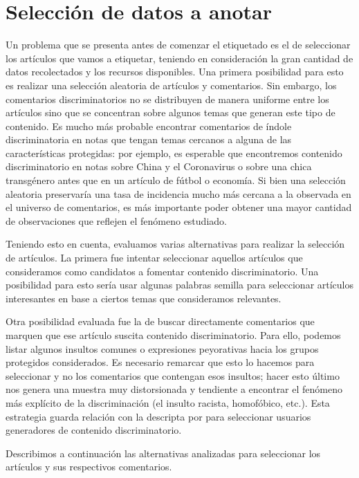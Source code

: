\section{Selección de datos a anotar}


Un problema que se presenta antes de comenzar el etiquetado es el de seleccionar los artículos que vamos a etiquetar, teniendo en consideración la gran cantidad de datos recolectados y los recursos disponibles. Una primera posibilidad para esto es realizar una selección aleatoria de artículos y comentarios. Sin embargo, los comentarios discriminatorios no se distribuyen de manera uniforme entre los artículos sino que se concentran sobre algunos temas que generan este tipo de contenido. Es mucho más probable encontrar comentarios de índole discriminatoria en notas que tengan temas cercanos a alguna de las características protegidas: por ejemplo, es esperable que encontremos contenido discriminatorio en notas sobre China y el Coronavirus o sobre una chica transgénero antes que en un artículo de fútbol o economía. Si bien una selección aleatoria preservaría una tasa de incidencia mucho más cercana a la observada en el universo de comentarios, es más importante poder obtener una mayor cantidad de observaciones que reflejen el fenómeno estudiado.

Teniendo esto en cuenta, evaluamos varias alternativas para realizar la selección de artículos. La primera fue intentar seleccionar aquellos artículos que consideramos como candidatos a fomentar contenido discriminatorio. Una posibilidad para esto sería usar algunas palabras semilla para seleccionar artículos interesantes en base a ciertos temas que consideramos relevantes.

Otra posibilidad evaluada fue la de buscar directamente comentarios que marquen que ese artículo suscita contenido discriminatorio. Para ello, podemos listar algunos insultos comunes o expresiones peyorativas hacia los grupos protegidos considerados. Es necesario remarcar que esto lo hacemos para seleccionar  y no los comentarios que contengan esos insultos; hacer esto último nos genera una muestra muy distorsionada y tendiente a encontrar el fenómeno más explícito de la discriminación (el insulto racista, homofóbico, etc.). Esta estrategia guarda relación con la descripta por \citet{hateval2019semeval} para seleccionar usuarios generadores de contenido discriminatorio.

Describimos a continuación las alternativas analizadas para seleccionar los artículos y sus respectivos comentarios.


